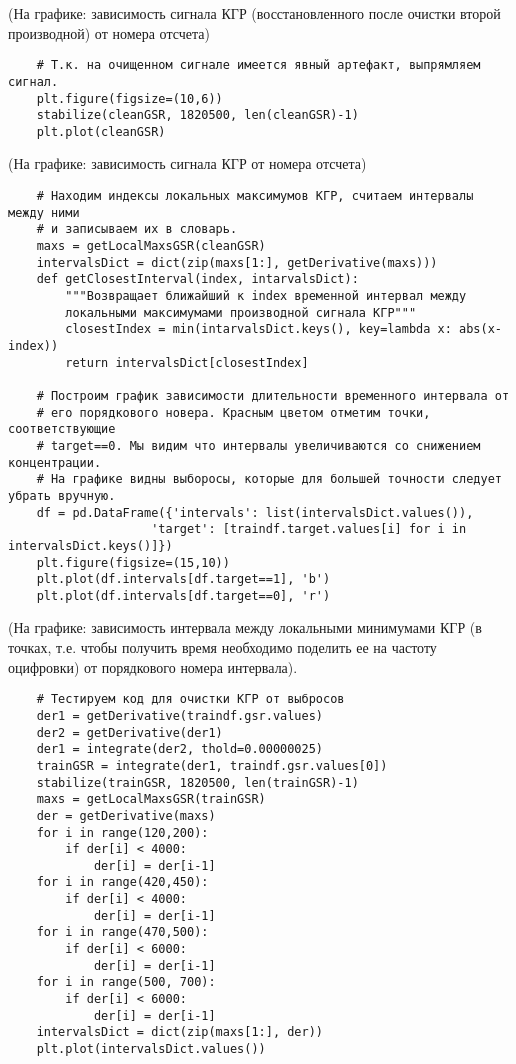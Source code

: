 
(На графике: зависимость сигнала КГР (восстановленного после очистки второй производной) от номера отсчета)

\begin{verbatim}
    # Т.к. на очищенном сигнале имеется явный артефакт, выпрямляем сигнал.
    plt.figure(figsize=(10,6))
    stabilize(cleanGSR, 1820500, len(cleanGSR)-1)
    plt.plot(cleanGSR)
\end{verbatim}


(На графике: зависимость сигнала КГР от номера отсчета)

\begin{verbatim}
    # Находим индексы локальных максимумов КГР, считаем интервалы между ними
    # и записываем их в словарь.
    maxs = getLocalMaxsGSR(cleanGSR)
    intervalsDict = dict(zip(maxs[1:], getDerivative(maxs)))
    def getClosestInterval(index, intarvalsDict):
        """Возвращает ближайший к index временной интервал между
        локальными максимумами производной сигнала КГР"""
        closestIndex = min(intarvalsDict.keys(), key=lambda x: abs(x-index))
        return intervalsDict[closestIndex]

    # Построим график зависимости длительности временного интервала от
    # его порядкового новера. Красным цветом отметим точки, соответствующие
    # target==0. Мы видим что интервалы увеличиваются со снижением концентрации.
    # На графике видны выборосы, которые для большей точности следует убрать вручную.
    df = pd.DataFrame({'intervals': list(intervalsDict.values()),
                    'target': [traindf.target.values[i] for i in intervalsDict.keys()]})
    plt.figure(figsize=(15,10))
    plt.plot(df.intervals[df.target==1], 'b')
    plt.plot(df.intervals[df.target==0], 'r')
\end{verbatim}


(На графике: зависимость интервала между локальными минимумами КГР (в точках, т.е. чтобы получить время необходимо поделить ее на частоту оцифровки) от порядкового номера интервала).

\begin{verbatim}
    # Тестируем код для очистки КГР от выбросов
    der1 = getDerivative(traindf.gsr.values)
    der2 = getDerivative(der1)
    der1 = integrate(der2, thold=0.00000025)
    trainGSR = integrate(der1, traindf.gsr.values[0])
    stabilize(trainGSR, 1820500, len(trainGSR)-1)
    maxs = getLocalMaxsGSR(trainGSR)
    der = getDerivative(maxs)
    for i in range(120,200):
        if der[i] < 4000:
            der[i] = der[i-1]
    for i in range(420,450):
        if der[i] < 4000:
            der[i] = der[i-1]
    for i in range(470,500):
        if der[i] < 6000:
            der[i] = der[i-1]
    for i in range(500, 700):
        if der[i] < 6000:
            der[i] = der[i-1]
    intervalsDict = dict(zip(maxs[1:], der))
    plt.plot(intervalsDict.values())
\end{verbatim}

